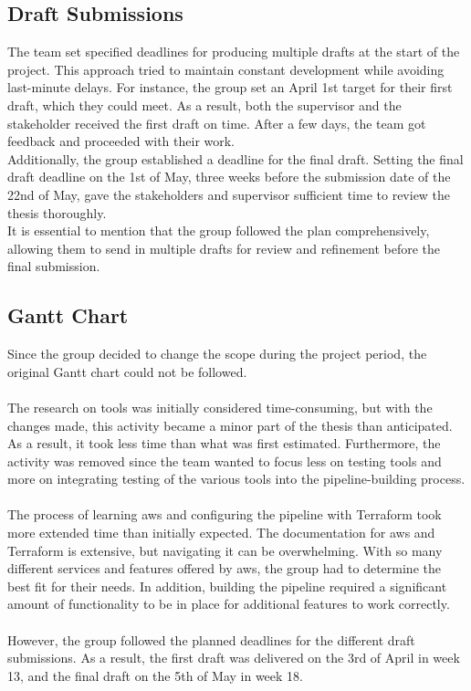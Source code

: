 \subsection{Draft Submissions}
The team set specified deadlines for producing multiple drafts at the start of the project. This approach tried to maintain constant development while avoiding last-minute delays. For instance, the group set an April 1st target for their first draft, which they could meet. As a result, both the supervisor and the stakeholder received the first draft on time. After a few days, the team got feedback and proceeded with their work. 
\\
Additionally, the group established a deadline for the final draft. Setting the final draft deadline on the 1st of May, three weeks before the submission date of the 22nd of May, gave the stakeholders and supervisor sufficient time to review the thesis thoroughly. 
\\
It is essential to mention that the group followed the plan comprehensively, allowing them to send in multiple drafts for review and refinement before the final submission. 



\subsection{Gantt Chart}
Since the group decided to change the scope during the project period, the original Gantt chart could not be followed. 
\\~\\
The research on tools was initially considered time-consuming, but with the changes made, this activity became a minor part of the thesis than anticipated. As a result, it took less time than what was first estimated. Furthermore, the  activity was removed since the team wanted to focus less on testing tools and more on integrating testing of the various tools into the pipeline-building process. 
\\~\\
The process of learning \acrshort{aws} and configuring the pipeline with Terraform took more extended time than initially expected.
The documentation for \acrshort{aws} and Terraform is extensive, but navigating it can be overwhelming. With so many different services and features offered by \acrshort{aws}, the group had to determine the best fit for their needs. In addition, building the pipeline required a significant amount of functionality to be in place for additional features to work correctly. 
\\~\\
However, the group followed the planned deadlines for the different draft submissions. As a result, the first draft was delivered on the 3rd of April in week 13, and the final draft on the 5th of May in week 18. 

